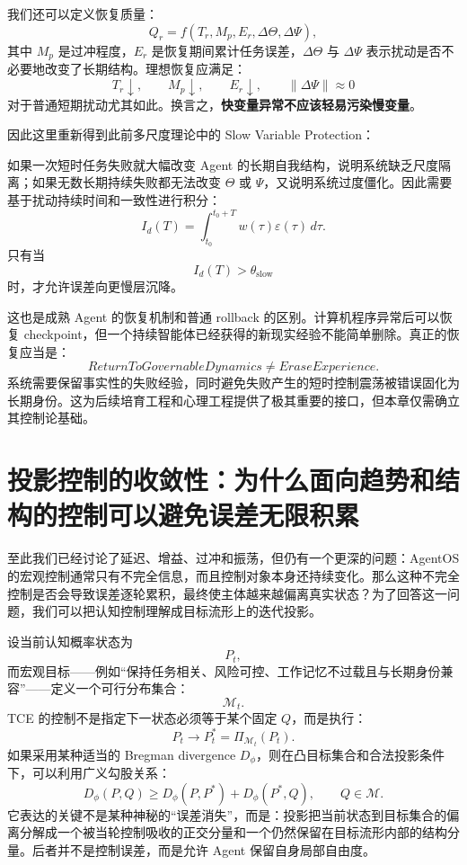 我们还可以定义恢复质量：
\[
Q_r
=
f
\left(
T_r,
M_p,
E_r,
\Delta\Theta,
\Delta\Psi
\right),
\]
其中 $M_p$ 是过冲程度，$E_r$ 是恢复期间累计任务误差，$\Delta\Theta$ 与 $\Delta\Psi$ 表示扰动是否不必要地改变了长期结构。理想恢复应满足：
\[
T_r\downarrow,
\qquad
M_p\downarrow,
\qquad
E_r\downarrow,
\qquad
\|\Delta\Psi\|\approx0
\]
对于普通短期扰动尤其如此。换言之，\textbf{快变量异常不应该轻易污染慢变量}。

因此这里重新得到此前多尺度理论中的 Slow Variable Protection：
\begin{statementbox}
\centering
{}
\end{statementbox}
如果一次短时任务失败就大幅改变 Agent 的长期自我结构，说明系统缺乏尺度隔离；如果无数长期持续失败都无法改变 $\Theta$ 或 $\Psi$，又说明系统过度僵化。因此需要基于扰动持续时间和一致性进行积分：
\[
I_d(T)
=
\int_{t_0}^{t_0+T}
w(\tau)
\varepsilon(\tau)\,d\tau.
\]
只有当
\[
I_d(T)>\theta_{\mathrm{slow}}
\]
时，才允许误差向更慢层沉降。

这也是成熟 Agent 的恢复机制和普通 rollback 的区别。计算机程序异常后可以恢复 checkpoint，但一个持续智能体已经获得的新现实经验不能简单删除。真正的恢复应当是：
\[
\boxed{
ReturnToGovernableDynamics
\neq
EraseExperience.
}
\]
系统需要保留事实性的失败经验，同时避免失败产生的短时控制震荡被错误固化为长期身份。这为后续培育工程和心理工程提供了极其重要的接口，但本章仅需确立其控制论基础。

\section{投影控制的收敛性：为什么面向趋势和结构的控制可以避免误差无限积累}

至此我们已经讨论了延迟、增益、过冲和振荡，但仍有一个更深的问题：AgentOS 的宏观控制通常只有不完全信息，而且控制对象本身还持续变化。那么这种不完全控制是否会导致误差逐轮累积，最终使主体越来越偏离真实状态？为了回答这一问题，我们可以把认知控制理解成目标流形上的迭代投影。

设当前认知概率状态为
\[
P_t,
\]
而宏观目标——例如“保持任务相关、风险可控、工作记忆不过载且与长期身份兼容”——定义一个可行分布集合：
\[
\mathcal M_t.
\]
TCE 的控制不是指定下一状态必须等于某个固定 $Q$，而是执行：
\[
P_t
\rightarrow
P_t^{*}
=
\Pi_{\mathcal M_t}(P_t).
\]
如果采用某种适当的 Bregman divergence $D_{\phi}$，则在凸目标集合和合法投影条件下，可以利用广义勾股关系：
\[
D_{\phi}(P,Q)
\ge
D_{\phi}(P,P^{*})
+
D_{\phi}(P^{*},Q),
\qquad
Q\in\mathcal M.
\]
它表达的关键不是某种神秘的“误差消失”，而是：投影把当前状态到目标集合的偏离分解成一个被当轮控制吸收的正交分量和一个仍然保留在目标流形内部的结构分量。后者并不是控制误差，而是允许 Agent 保留自身局部自由度。

